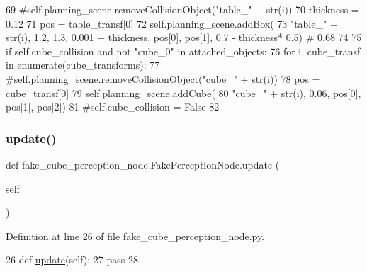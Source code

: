 \begin{DoxyCode}
69                     \textcolor{comment}{#self.planning\_scene.removeCollisionObject("table\_" + str(i))}
70                     thickness = 0.12
71                     pos = table\_transf[0]
72                     self.planning\_scene.addBox(
73                         \textcolor{stringliteral}{"table\_"} + str(i), 1.2, 1.3, 0.001 + thickness, pos[0],  pos[1],  0.7 -  thickness*
      0.5)  \textcolor{comment}{# 0.68}
74 
75             \textcolor{keywordflow}{if} self.cube\_collision \textcolor{keywordflow}{and} \textcolor{keywordflow}{not} \textcolor{stringliteral}{"cube\_0"} \textcolor{keywordflow}{in} attached\_objects:
76                 \textcolor{keywordflow}{for} i, cube\_transf \textcolor{keywordflow}{in} enumerate(cube\_transforms):
77                     \textcolor{comment}{#self.planning\_scene.removeCollisionObject("cube\_" + str(i))}
78                     pos = cube\_transf[0]
79                     self.planning\_scene.addCube(
80                         \textcolor{stringliteral}{"cube\_"} + str(i), 0.06, pos[0],  pos[1],  pos[2])
81                     \textcolor{comment}{#self.cube\_collision = False}
82 
\end{DoxyCode}
\mbox{\label{classfake__cube__perception__node_1_1FakePerceptionNode_ae73741e7f84f057cbf109698e70a2515}} 
\subsubsection{\texorpdfstring{update()}{update()}}
{\footnotesize\ttfamily def fake\+\_\+cube\+\_\+perception\+\_\+node.\+Fake\+Perception\+Node.\+update (\begin{DoxyParamCaption}\item[{}]{self }\end{DoxyParamCaption})}



Definition at line 26 of file fake\+\_\+cube\+\_\+perception\+\_\+node.\+py.


\begin{DoxyCode}
26     \textcolor{keyword}{def }\hyperlink{servers_2opencv__perception__node_2opencv__perception__node_8cpp_ac5c54df7ed3b930268c8d7752c101725}{update}(self):
27         \textcolor{keywordflow}{pass}
28 
\end{DoxyCode}



